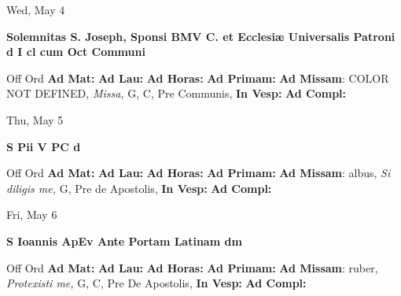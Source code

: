 \documentclass[10pt]{book}
\begin{document}
\begin{center}
\begin{minipage}{3.5in}
\vspace{2em}
\begin{center}Wed, May 4
\end{center}
\textbf{ \large Solemnitas S. Joseph, Sponsi BMV C. et Ecclesiæ Universalis Patroni
\textnormal{\normalsize d I cl cum Oct Communi}}

\begin{justify}Off Ord
\textbf{Ad Mat: }
\textbf{Ad Lau: }
\textbf{Ad Horas: }
\textbf{Ad Primam: }\textbf{Ad Missam}: COLOR NOT DEFINED, \textit{Missa,} G, C, Pre Communis, 
\textbf{In Vesp: }
\textbf{Ad Compl: }
\end{justify}
\end{minipage}
\end{center}

\begin{center}
\begin{minipage}{3.5in}
\vspace{2em}
\begin{center}Thu, May 5
\end{center}
\textbf{ \large S Pii V PC
\textnormal{\normalsize d}}

\begin{justify}Off Ord
\textbf{Ad Mat: }
\textbf{Ad Lau: }
\textbf{Ad Horas: }
\textbf{Ad Primam: }\textbf{Ad Missam}: albus, \textit{Si diligis me,} G, Pre de Apostolis, 
\textbf{In Vesp: }
\textbf{Ad Compl: }
\end{justify}
\end{minipage}
\end{center}

\begin{center}
\begin{minipage}{3.5in}
\vspace{2em}
\begin{center}Fri, May 6
\end{center}
\textbf{ \large S Ioannis ApEv Ante Portam Latinam
\textnormal{\normalsize dm}}

\begin{justify}Off Ord
\textbf{Ad Mat: }
\textbf{Ad Lau: }
\textbf{Ad Horas: }
\textbf{Ad Primam: }\textbf{Ad Missam}: ruber, \textit{Protexisti me,} G, C, Pre De Apostolis, 
\textbf{In Vesp: }
\textbf{Ad Compl: }
\end{justify}
\end{minipage}
\end{center}
\end{document}
